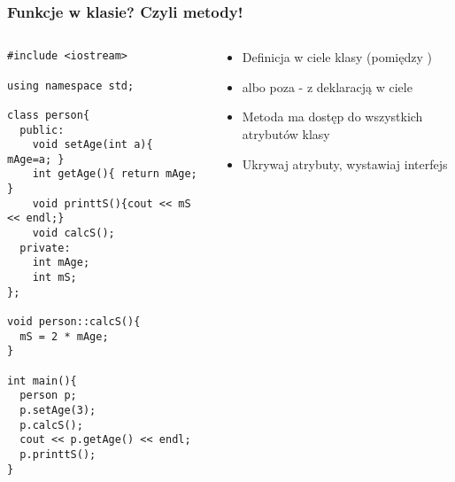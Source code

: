 \documentclass[10pt]{beamer}
\begin{document}
\begin{frame}[fragile]
  \frametitle{Funkcje w klasie? Czyli metody!}
  \begin{columns}
    \begin{column}{0.48\textwidth}
\begin{lstlisting}
#include <iostream>

using namespace std;

class person{
  public:
    void setAge(int a){ mAge=a; }
    int getAge(){ return mAge; }
    void printtS(){cout << mS << endl;}
    void calcS();
  private:
    int mAge;
    int mS;
};

void person::calcS(){
  mS = 2 * mAge;
}

int main(){
  person p;
  p.setAge(3);
  p.calcS();
  cout << p.getAge() << endl;
  p.printtS();
}


\end{lstlisting}
    \end{column}
    \begin{column}{0.48\textwidth}
      \begin{itemize}
        \item Definicja w ciele klasy (pomiędzy {})
        \item albo poza - z deklaracją w ciele
        \item Metoda ma dostęp do wszystkich atrybutów klasy  
        \item Ukrywaj atrybuty, wystawiaj interfejs     
      \end{itemize}
    \end{column}
  \end{columns}
\end{frame}
\end{document}
